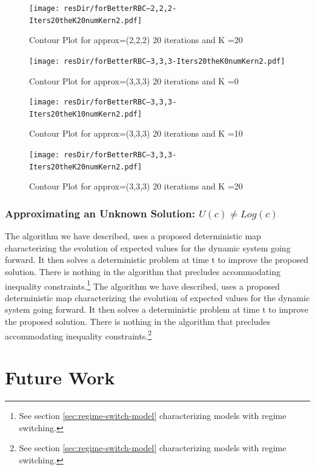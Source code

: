 \documentclass[12pt]{article}
\begin{document}
\begin{figure}
  \centering
\ifmacosx
  \texttt{[image: resDir/forBetterRBC--2,2,2-Iters20theK20numKern2.pdf]}
\fi
  \caption{Contour Plot for approx=(2,2,2) 20 iterations and K =20}
  \label{fig:cntpltG}
\end{figure}

\begin{figure}
  \centering
\ifmacosx
  \texttt{[image: resDir/forBetterRBC--3,3,3-Iters20theK0numKern2.pdf]}
\fi
  \caption{Contour Plot for approx=(3,3,3) 20 iterations and K =0}
  \label{fig:cntpltH}
\end{figure}

\begin{figure}
  \centering
\ifmacosx
  \texttt{[image: resDir/forBetterRBC--3,3,3-Iters20theK10numKern2.pdf]}
  \fi
  \caption{Contour Plot for approx=(3,3,3) 20 iterations and K =10}
  \label{fig:cntpltI}
\end{figure}

\begin{figure}
  \centering
\ifmacosx
  \texttt{[image: resDir/forBetterRBC--3,3,3-Iters20theK20numKern2.pdf]}
  \fi
  \caption{Contour Plot for approx=(3,3,3) 20 iterations and K =20}
  \label{fig:cntpltI}
\end{figure}
\subsubsection{Approximating an Unknown Solution: $U(c) \ne Log(c)$ }
\label{sec:unknown-solutions}

The algorithm we have described,
uses a proposed deterministic map
characterizing the evolution of expected values for
the dynamic system going forward. It then solves
a deterministic problem at time t to improve the proposed solution.
There is nothing in the algorithm that precludes accommodating  inequality
constraints.\footnote{See section \ref{sec:regime-switch-model} characterizing
  models with regime switching.} 
The algorithm we have described,
uses a proposed deterministic map
characterizing the evolution of expected values for
the dynamic system going forward. It then solves
a deterministic problem at time t to improve the proposed solution.
There is nothing in the algorithm that precludes accommodating  inequality
constraints.\footnote{See section \ref{sec:regime-switch-model} characterizing
  models with regime switching.}


\section{Future Work}
\label{sec:future}
\end{document}
